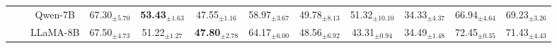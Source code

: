 \begin{table*}[!h]
{\begin{tabular}{ccc|ccccccccc}
    & & Qwen-7B  & 67.30$_{\pm \text{5.70}}$ & \cellcolor{yellow!20}\textbf{53.43$_{\pm \text{1.63}}$} & 47.55$_{\pm \text{1.16}}$ & 58.97$_{\pm \text{3.67}}$ & 49.78$_{\pm \text{8.13}}$ & 51.32$_{\pm \text{10.10}}$ & 34.33$_{\pm \text{4.37}}$ & 66.94$_{\pm \text{4.64}}$ & 69.23$_{\pm \text{3.26}}$  \\ 
   & & LLaMA-8B & 67.50$_{\pm \text{4.73}}$ & 51.22$_{\pm \text{1.27}}$ & \cellcolor{yellow!20}\textbf{47.80$_{\pm \text{2.78}}$} & 64.17$_{\pm \text{6.00}}$ & 48.56$_{\pm \text{6.92}}$ & 43.31$_{\pm \text{0.94}}$ & 34.49$_{\pm \text{1.48}}$ & 72.45$_{\pm \text{0.35}}$ & 71.43$_{\pm \text{4.43}}$ \\ 

      \bottomrule
    \end{tabular}
    }
    \label{tab:llaga_llm}
\end{table*}